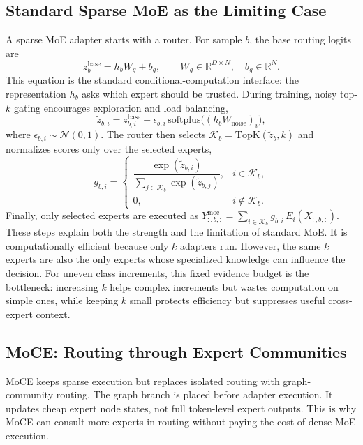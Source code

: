 \documentclass{article}
\theoremstyle{definition}
\theoremstyle{remark}
\begin{document}
\subsection{Standard Sparse MoE as the Limiting Case}
A sparse MoE adapter starts with a router. For sample $b$, the base routing logits are
\begin{equation}
    z^{\mathrm{base}}_{b}=h_b W_g+b_g,
    \qquad W_g\in\mathbb{R}^{D\times N},\quad b_g\in\mathbb{R}^{N}.
    \label{eq:base_router}
\end{equation}
This equation is the standard conditional-computation interface: the representation $h_b$ asks which expert should be trusted. During training, noisy top-$k$ gating encourages exploration and load balancing,
\begin{equation}
    \tilde z_{b,i}=z^{\mathrm{base}}_{b,i}+\epsilon_{b,i}\,\mathrm{softplus}\big((h_b W_{\mathrm{noise}})_i\big),
    \label{eq:noisy_logits}
\end{equation}
where $\epsilon_{b,i}\sim\mathcal{N}(0,1)$. The router then selects
$
    \mathcal{K}_{b}=\mathrm{TopK}(\tilde z_b,k)
$
and normalizes scores only over the selected experts,
\begin{equation}
    g_{b,i}=\begin{cases}
    \dfrac{\exp(\tilde z_{b,i})}{\sum_{j\in\mathcal{K}_b}\exp(\tilde z_{b,j})}, & i\in\mathcal{K}_b,\\[6pt]
    0, & i\notin\mathcal{K}_b.
    \end{cases}
    \label{eq:sparse_gate}
\end{equation}
Finally, only selected experts are executed as $
    Y^{\mathrm{moe}}_{:,b,:}=\sum_{i\in\mathcal{K}_b} g_{b,i}\,E_i(X_{:,b,:})$.
These steps explain both the strength and the limitation of standard MoE. It is computationally efficient because only $k$ adapters run. However, the same $k$ experts are also the only experts whose specialized knowledge can influence the decision. For uneven class increments, this fixed evidence budget is the bottleneck: increasing $k$ helps complex increments but wastes computation on simple ones, while keeping $k$ small protects efficiency but suppresses useful cross-expert context.

\subsection{MoCE: Routing through Expert Communities}
MoCE keeps sparse execution but replaces isolated routing with graph-community routing. The graph branch is placed before adapter execution. It updates cheap expert node states, not full token-level expert outputs. This is why MoCE can consult more experts in routing without paying the cost of dense MoE execution.
\end{document}
